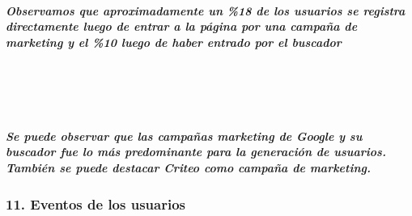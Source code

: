 \documentclass[11pt]{article}
\begin{document}
    \hypertarget{observamos-que-aproximadamente-un-18-de-los-usuarios-se-registra-directamente-luego-de-entrar-a-la-puxe1gina-por-una-campauxf1a-de-marketing-y-el-10-luego-de-haber-entrado-por-el-buscador}{%
\subparagraph{Observamos que aproximadamente un \%18 de los usuarios se
registra directamente luego de entrar a la página por una campaña de
marketing y el \%10 luego de haber entrado por el
buscador}\label{observamos-que-aproximadamente-un-18-de-los-usuarios-se-registra-directamente-luego-de-entrar-a-la-puxe1gina-por-una-campauxf1a-de-marketing-y-el-10-luego-de-haber-entrado-por-el-buscador}}

   
    \begin{center}
    \end{center}
    { \hspace*{\fill} \\}
    
    \begin{center}
    \end{center}
    { \hspace*{\fill} \\}
    
    \hypertarget{se-puede-observar-que-las-campauxf1as-marketing-de-google-y-su-buscador-fue-lo-muxe1s-predominante-para-la-generaciuxf3n-de-usuarios.-tambiuxe9n-se-puede-destacar-criteo-como-campauxf1a-de-marketing.}{%
\subparagraph{Se puede observar que las campañas marketing de Google y
su buscador fue lo más predominante para la generación de usuarios.
También se puede destacar Criteo como campaña de
marketing.}\label{se-puede-observar-que-las-campauxf1as-marketing-de-google-y-su-buscador-fue-lo-muxe1s-predominante-para-la-generaciuxf3n-de-usuarios.-tambiuxe9n-se-puede-destacar-criteo-como-campauxf1a-de-marketing.}}

  \hypertarget{eventos-de-los-usuarios}{%
\subsubsection{11. Eventos de los
usuarios}\label{eventos-de-los-usuarios}}

    \begin{center}
    \end{center}
    { \hspace*{\fill} \\}
    
\end{document}
